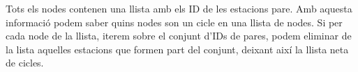 \documentclass[a4paper,12pt]{article}
\begin{document}
    Tots els nodes contenen una llista amb els ID de les estacions pare. Amb aquesta informació podem saber quins nodes son un cicle en una llista de nodes. Si per cada node de la llista, iterem sobre el conjunt d’IDs de pares, podem eliminar de la lista aquelles estacions que formen part del conjunt, deixant així la llista neta de cicles.

\end{document}
